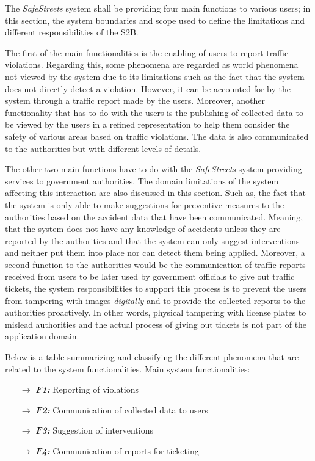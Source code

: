 The \emph{SafeStreets} system shall be providing four main functions to various users; in this section, the system boundaries and scope used to define the limitations and different responsibilities of the S2B. 

The first of the main functionalities is the enabling of users to report traffic violations. Regarding this, some phenomena are regarded as world phenomena not viewed by the system due to its limitations such as the fact that the system does not directly detect a violation. However, it can be accounted for by the system through a traffic report made by the users. Moreover, another functionality that has to do with the users is the publishing of collected data to be viewed by the users in a refined representation to help them consider the safety of various areas based on traffic violations. The data is also communicated to the authorities but with different levels of details.

The other two main functions have to do with the \emph{SafeStreets} system providing services to government authorities. The domain limitations of the system affecting this interaction are also discussed in this section. Such as, the fact that the system is only able to make suggestions for preventive measures to the authorities based on the accident data that have been communicated. Meaning, that the system does not have any knowledge of accidents unless they are reported by the authorities and that the system can only suggest interventions and neither put them into place nor can detect them being applied. Moreover, a second function to the authorities would be the communication of traffic reports received from users to be later used by government officials to give out traffic tickets, the system responsibilities to support this process is to prevent the users from tampering with images \emph{digitally} and to provide the collected reports to the authorities proactively. In other words, physical tampering with license plates to mislead authorities and the actual process of giving out tickets is not part of the application domain. 

Below is a table summarizing and classifying the different phenomena that are related to the system functionalities. 
Main system functionalities:

\begin{itemize}
\item[$\rightarrow$] \emph{\textbf{F1:}} Reporting of violations
\item[$\rightarrow$] \emph{\textbf{F2:}} Communication of collected data to users
\item[$\rightarrow$] \emph{\textbf{F3:}} Suggestion of interventions
\item[$\rightarrow$] \emph{\textbf{F4:}} Communication of reports for ticketing
\end{itemize}

